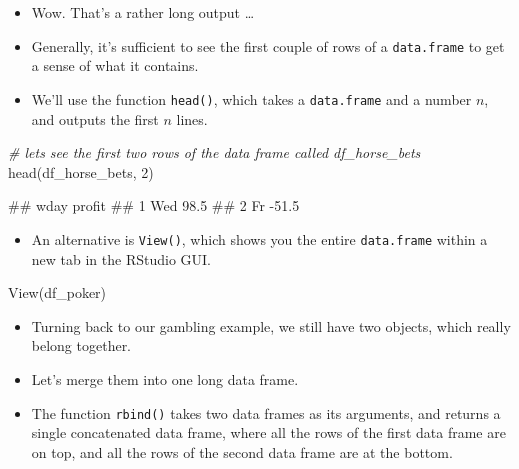 \documentclass[
]{book}
\newenvironment{Shaded}{\begin{snugshade}}{\end{snugshade}}
\newcommand{\CommentTok}[1]{\textcolor[rgb]{0.56,0.35,0.01}{\textit{#1}}}
\newcommand{\DecValTok}[1]{\textcolor[rgb]{0.00,0.00,0.81}{#1}}
\newcommand{\FunctionTok}[1]{\textcolor[rgb]{0.00,0.00,0.00}{#1}}
\newcommand{\NormalTok}[1]{#1}
\providecommand{\tightlist}{%
  \setlength{\itemsep}{0pt}\setlength{\parskip}{0pt}}
\begin{document}
\begin{itemize}
\item
  Wow. That's a rather long output \ldots{}
\item
  Generally, it's sufficient to see the first couple of rows of a \texttt{data.frame} to get a sense of what it contains.
\item
  We'll use the function \texttt{head()}, which takes a \texttt{data.frame} and a number \(n\), and outputs the first \(n\) lines.
\end{itemize}

\begin{Shaded}
\begin{Highlighting}[]
\CommentTok{\# let\textquotesingle{}s see the first two rows of the data frame called df\_horse\_bets}
\FunctionTok{head}\NormalTok{(df\_horse\_bets, }\DecValTok{2}\NormalTok{) }
\end{Highlighting}
\end{Shaded}

\begin{Shaded}
\begin{Highlighting}[]
\NormalTok{\#\#   wday profit}
\NormalTok{\#\# 1  Wed   98.5}
\NormalTok{\#\# 2   Fr  {-}51.5}
\end{Highlighting}
\end{Shaded}

\begin{itemize}
\tightlist
\item
  An alternative is \texttt{View()}, which shows you the entire \texttt{data.frame} within a new tab in the RStudio GUI.
\end{itemize}

\begin{Shaded}
\begin{Highlighting}[]
\FunctionTok{View}\NormalTok{(df\_poker)}
\end{Highlighting}
\end{Shaded}

\begin{itemize}
\item
  Turning back to our gambling example, we still have two objects, which really belong together.
\item
  Let's merge them into one long data frame.
\item
  The function \texttt{rbind()} takes two data frames as its arguments, and returns a single concatenated data frame, where all the rows of the first data frame are on top, and all the rows of the second data frame are at the bottom.
\end{itemize}
\end{document}
